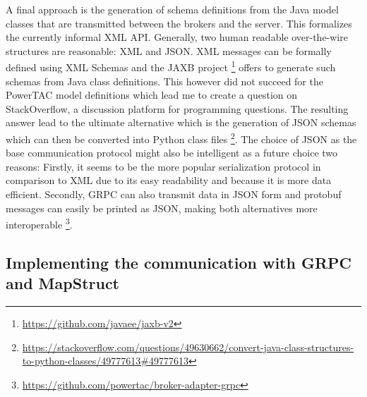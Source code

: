 A final approach is the generation of schema definitions from the Java model classes that are transmitted between the
brokers and the server. This formalizes the currently informal \ac {XML} \ac{API}. Generally, two human readable over-the-wire structures are reasonable: \ac {XML} and \ac{JSON}.
\ac {XML} messages can be formally defined using \ac {XML} Schemas and the \ac{JAXB} project
\footnote{\url{https://github.com/javaee/jaxb-v2}} offers to generate such schemas from Java class definitions. This
however did not succeed for the \ac {PowerTAC} model definitions which lead me to create a question on StackOverflow, a
discussion platform for programming questions. The resulting answer lead to the ultimate alternative which is the
generation of \ac {JSON} schemas which can then be converted into Python class files
\footnote{\url{https://stackoverflow.com/questions/49630662/convert-java-class-structures-to-python-classes/49777613\#49777613}}.
The choice of \ac {JSON} as the base communication protocol might also be intelligent as a future choice two reasons:
Firstly, it seems to be the more popular serialization protocol in comparison to \ac {XML} \citep{jsonxml} due to its
easy readability and because it is more data efficient. Secondly, \ac {GRPC} can also transmit data in \ac {JSON} form
and protobuf messages can easily be printed as \ac {JSON}, making both alternatives more interoperable
\footnote{\url{https://github.com/powertac/broker-adapter-grpc} }.


\subsection{Implementing the communication with \ac {GRPC} and MapStruct}%
\label{sub:implementing_the_communication_with_ac_grpc_and_mapstruct}

